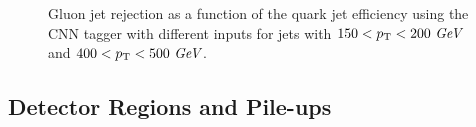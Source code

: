 \begin{figure}[htpb]
\begin{center}
\caption{Gluon jet rejection as a function of the quark jet efficiency using the CNN tagger with different inputs
for jets with \protect{} $150<p_{{\rm T}}<200~\textit{GeV}$ and \protect{} $400<p_{{\rm T}}<500~\textit{GeV}$.}
\label{fig:cnn-input}
\end{center}
\end{figure}




\subsection{Detector Regions and Pile-ups}
\label{sec:cnn-detectorregion}

